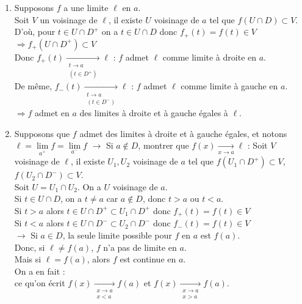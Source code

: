 \documentclass[12pt,a4paper]{report}
\begin{document}
\begin{demo}
\begin{enumerate}
	\item Supposons $f$ a une limite $\ell$ en $a$. \\
	Soit $V$ un voisinage de $\ell$, il existe $U$ voisinage de $a$ tel que $f(U \cap D) \subset V$. \\
	D'où, pour $t \in U \cap D^+$ on a $t \in U \cap D$ donc $f_+(t) = f(t) \in V$ \\
	$\Longrightarrow f_+(U \cap D^+) \subset V$ \\
	Donc $f_+(t) \xrightarrow[\substack{t \to a \\ (t \in D^+)}]{} \ell$ : $f$ admet $\ell$ comme limite à droite en $a$. \\
	De même, $f_-(t) \xrightarrow[\substack{t \to a \\ (t \in D^-)}]{} \ell$ : $f$ admet $\ell$ comme limite à gauche en $a$. \\
	$\Longrightarrow f$ admet en $a$ des limites à droite et à gauche égales à $\ell$.
	
	\item Supposons que $f$ admet des limites à droite et à gauche égales, et notons $\ell = \underset{a^+}{\lim} f = \underset{a^-}{\lim} f$
		$\longrightarrow$ Si $a \not \in D$, montrer que $f(x) \xrightarrow[x \to a]{} \ell$ : Soit $V$ voisinage de $\ell$, il existe $U_1,U_2$ voisinage de $a$ tel que $f(U_1 \cap D^+) \subset V$, \quad $f(U_2 \cap D^-) \subset V$. \\
		Soit $U = U_1 \cap U_2$. On a $U$ voisinage de $a$. \\
		Si $t \in U \cap D$, on a $t \neq a$ car $a \not \in D$, donc $t > a$ ou $t < a$. \\
			Si $t > a$ alors $t \in U \cap D^+ \subset U_1 \cap D^+$ donc $f_+(t) = f(t) \in V$ \\
			Si $t < a$ alors $t \in U \cap D^- \subset U_2 \cap D^-$ donc $f_-(t) = f(t) \in V$ \\
		$\longrightarrow$ Si $a \in D$, la seule limite possible pour $f$ en $a$ est $f(a)$. \\
		Donc, si $\ell \neq f(a)$, $f$ n'a pas de limite en $a$. \\
		Mais si $\ell = f(a)$, alors $f$ est continue en $a$. \\
		On a en fait :  \\
		ce qu'on écrit $f(x) \xrightarrow[\substack{x \to a \\ x < a}]{} f(a)$ et $f(x) \xrightarrow[\substack{x \to a \\ x > a}]{} f(a)$.
\end{enumerate}
\end{demo}
\end{document}
